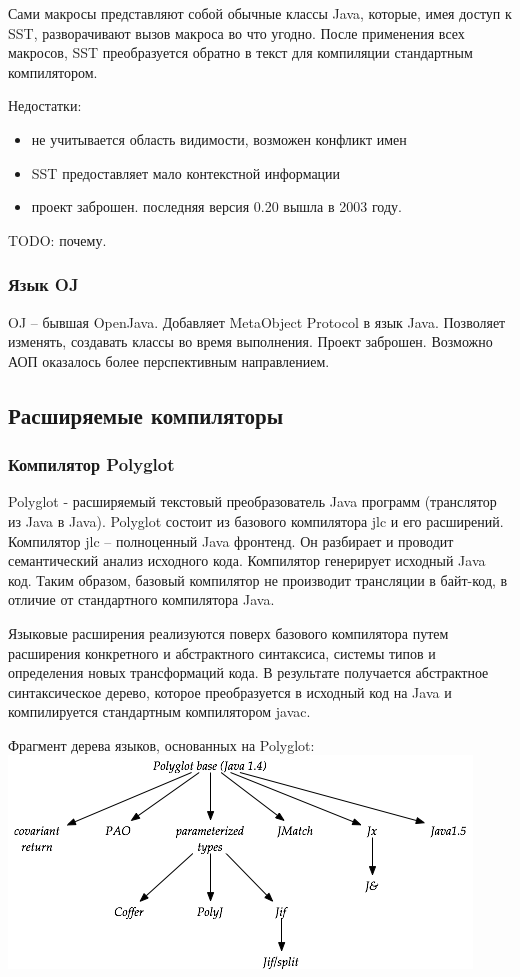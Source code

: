 \documentclass[a4paper,12pt]{article}
\begin{document}
Сами макросы представляют собой обычные классы Java, которые, имея доступ к
SST, разворачивают вызов макроса во что угодно. После применения всех макросов,
SST преобразуется обратно в текст для компиляции стандартным компилятором.

Недостатки:
\begin{itemize}
 \item не учитывается область видимости, возможен конфликт имен
 \item SST предоставляет мало контекстной информации
 \item проект заброшен. последняя версия 0.20 вышла в 2003 году.
\end{itemize}
TODO: почему.

\subsubsection{Язык OJ}
OJ -- бывшая OpenJava. Добавляет MetaObject Protocol в язык Java.
Позволяет изменять, создавать классы во время выполнения.
Проект заброшен. Возможно АОП оказалось более перспективным направлением.

\subsection{Расширяемые компиляторы}
\label{extcomp}
\subsubsection{Компилятор Polyglot}
Polyglot - расширяемый текстовый преобразователь Java программ (транслятор из
Java в Java). Polyglot состоит из базового компилятора jlc и его расширений.
Компилятор jlc -- полноценный Java фронтенд. Он разбирает и проводит
семантический анализ исходного кода. Компилятор генерирует исходный Java код.
Таким образом, базовый компилятор не производит трансляции в байт-код, в
отличие от стандартного компилятора Java.

Языковые расширения реализуются поверх базового компилятора путем расширения
конкретного и абстрактного синтаксиса, системы типов и определения новых
трансформаций кода. В результате получается абстрактное синтаксическое дерево,
которое преобразуется в исходный код на Java и компилируется стандартным
компилятором javac.

\begin{center}
Фрагмент дерева языков, основанных на Polyglot:
\nopagebreak
 \includegraphics[scale=0.6]{img/polyglot-tree.png}
\end{center}
\end{document}
